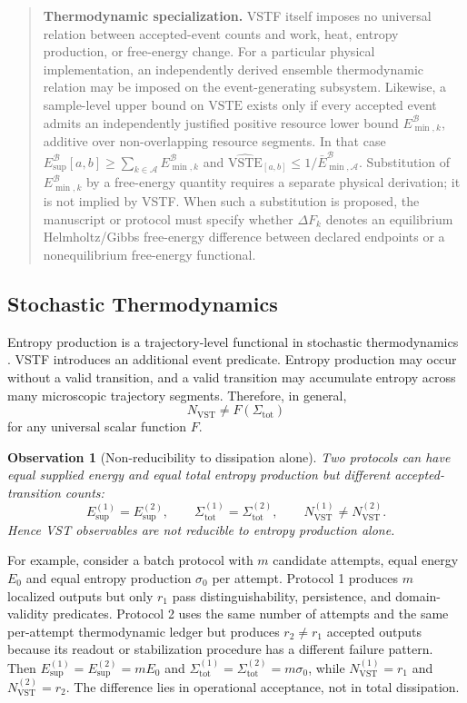 \documentclass[11pt,a4paper]{article}
\newtheorem{observation}{Observation}
\newcommand{\VST}{\ensuremath{\mathrm{VST}}}
\newcommand{\VSTE}{\ensuremath{\mathrm{VSTE}}}
\newcommand{\1}{\mathbf{1}}
\begin{document}
\begin{quote}
\textbf{Thermodynamic specialization.} VSTF itself imposes no universal relation between accepted-event counts and work, heat, entropy production, or free-energy change. For a particular physical implementation, an independently derived ensemble thermodynamic relation may be imposed on the event-generating subsystem. Likewise, a sample-level upper bound on \VSTE{} exists only if every accepted event admits an independently justified positive resource lower bound $E_{\min,k}^{\mathcal{B}}$, additive over non-overlapping resource segments. In that case $E_{\mathrm{sup}}^{\mathcal{B}}[a,b]\geq\sum_{k\in\mathcal{A}}E_{\min,k}^{\mathcal{B}}$ and $\widehat{\VSTE}_{[a,b]}\leq1/\bar{E}_{\min,\mathcal{A}}^{\mathcal{B}}$. Substitution of $E_{\min,k}^{\mathcal{B}}$ by a free-energy quantity requires a separate physical derivation; it is not implied by VSTF. When such a substitution is proposed, the manuscript or protocol must specify whether $\Delta F_k$ denotes an equilibrium Helmholtz/Gibbs free-energy difference between declared endpoints or a nonequilibrium free-energy functional.
\end{quote}

\subsection{Stochastic Thermodynamics}

Entropy production is a trajectory-level functional in stochastic thermodynamics \cite{seifert2005,seifert2012,barato2015}. VSTF introduces an additional event predicate. Entropy production may occur without a valid transition, and a valid transition may accumulate entropy across many microscopic trajectory segments. Therefore, in general,
\[
  N_{\VST}\neq F(\Sigma_{\mathrm{tot}})
\]
for any universal scalar function $F$.

\begin{observation}[Non-reducibility to dissipation alone]
Two protocols can have equal supplied energy and equal total entropy production but different accepted-transition counts:
\[
  E^{(1)}_{\mathrm{sup}}=E^{(2)}_{\mathrm{sup}},\qquad
  \Sigma^{(1)}_{\mathrm{tot}}=\Sigma^{(2)}_{\mathrm{tot}},\qquad
  N^{(1)}_{\VST}\neq N^{(2)}_{\VST}.
\]
Hence VST observables are not reducible to entropy production alone.
\end{observation}

For example, consider a batch protocol with $m$ candidate attempts, equal energy $E_0$ and equal entropy production $\sigma_0$ per attempt. Protocol 1 produces $m$ localized outputs but only $r_1$ pass distinguishability, persistence, and domain-validity predicates. Protocol 2 uses the same number of attempts and the same per-attempt thermodynamic ledger but produces $r_2\neq r_1$ accepted outputs because its readout or stabilization procedure has a different failure pattern. Then $E_{\mathrm{sup}}^{(1)}=E_{\mathrm{sup}}^{(2)}=mE_0$ and $\Sigma_{\mathrm{tot}}^{(1)}=\Sigma_{\mathrm{tot}}^{(2)}=m\sigma_0$, while $N_{\VST}^{(1)}=r_1$ and $N_{\VST}^{(2)}=r_2$. The difference lies in operational acceptance, not in total dissipation.
\end{document}

